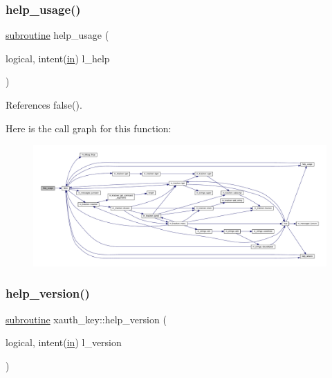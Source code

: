 \subsubsection{\texorpdfstring{help\+\_\+usage()}{help\_usage()}}
{\footnotesize\ttfamily \hyperlink{M__stopwatch_83_8txt_acfbcff50169d691ff02d4a123ed70482}{subroutine} help\+\_\+usage (\begin{DoxyParamCaption}\item[{logical, intent(\hyperlink{M__journal_83_8txt_afce72651d1eed785a2132bee863b2f38}{in})}]{l\+\_\+help }\end{DoxyParamCaption})}



References false().

Here is the call graph for this function\+:
\nopagebreak
\begin{figure}[H]
\begin{center}
\leavevmode
\includegraphics[width=350pt]{xauth__key_8f90_a3e09a3b52ee8fb04eeb93fe5761626a8_cgraph}
\end{center}
\end{figure}
\mbox{\label{xauth__key_8f90_ad2aaabc58e93e13e8a0d5acf843eb5d0}} 
\subsubsection{\texorpdfstring{help\+\_\+version()}{help\_version()}}
{\footnotesize\ttfamily \hyperlink{M__stopwatch_83_8txt_acfbcff50169d691ff02d4a123ed70482}{subroutine} xauth\+\_\+key\+::help\+\_\+version (\begin{DoxyParamCaption}\item[{logical, intent(\hyperlink{M__journal_83_8txt_afce72651d1eed785a2132bee863b2f38}{in})}]{l\+\_\+version }\end{DoxyParamCaption})}




